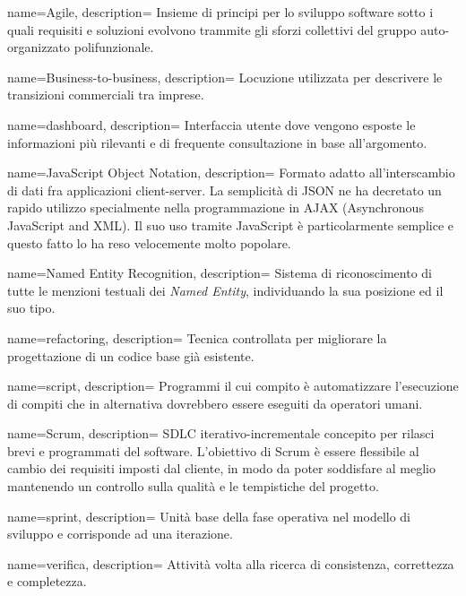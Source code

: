  {
name=Agile,
description={
Insieme di principi per lo sviluppo software sotto i quali requisiti e
soluzioni evolvono trammite gli sforzi collettivi del gruppo auto-organizzato
polifunzionale.
}
}

 {
name=Business-to-business,
description={
Locuzione utilizzata per descrivere le transizioni commerciali tra imprese.
}
}

 {
name=dashboard,
description={
Interfaccia utente dove vengono esposte le informazioni più rilevanti e di
frequente consultazione in base all'argomento.
}
}

 {
name=JavaScript Object Notation,
description={
Formato adatto all’interscambio di dati fra applicazioni client-server. La
semplicità di JSON ne ha decretato un rapido utilizzo specialmente nella
programmazione in AJAX (Asynchronous JavaScript and XML). Il suo uso tramite
JavaScript è particolarmente semplice e questo fatto lo ha reso velocemente
molto popolare.
}
}

 {
name=Named Entity Recognition,
description={
Sistema di riconoscimento di tutte le menzioni testuali dei
\textit{Named Entity}, individuando la sua posizione ed il suo tipo.
}
}

 {
name=refactoring,
description={
Tecnica controllata per migliorare la progettazione di un codice base già
esistente.
}
}

 {
name=script,
description={
Programmi il cui compito è automatizzare l'esecuzione di compiti che in
alternativa dovrebbero essere eseguiti da operatori umani.
}
}

 {
name=Scrum,
description={
SDLC iterativo-incrementale concepito per rilasci brevi e programmati del
software. L'obiettivo di Scrum è essere flessibile al cambio dei requisiti
imposti dal cliente, in modo da poter soddisfare al meglio mantenendo un
controllo sulla qualità e le tempistiche del progetto.
}
}

 {
name=sprint,
description={
Unità base della fase operativa nel modello di sviluppo  e
corrisponde ad una iterazione.
}
}

 {
name=verifica,
description={
Attività volta alla ricerca di consistenza, correttezza e completezza.
}
}

\makeglossaries

